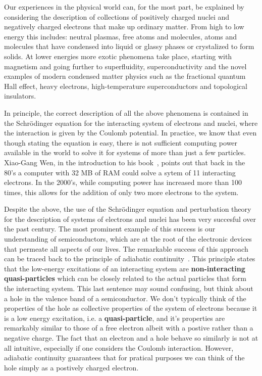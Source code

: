\documentclass[oneside,11pt]{memoir}
\begin{document}
Our experiences in the physical world can, for the most part, be explained by
considering the description of collections of positively charged nuclei and
negatively charged electrons that make up ordinary matter.    From high to low
energy this includes: neutral plasmas,  free atoms and molecules, atoms and
molecules that have condensed into liquid or glassy phases or crystalized to
form solids.   At lower energies more exotic phenomena take place, starting
with magnetism and going further to superfluidity, superconductivity and the
novel examples of modern condensed matter physics such as the fractional
quantum Hall effect, heavy electrons, high-temperature superconductors and
topological insulators.

In principle,  the correct description of all the above phenomena is contained
in the Schr\"{o}dinger equation for the interacting system of electrons and
nuclei,  where the interaction is given by the Coulomb potential. In practice,
we know that even though stating the equation is easy, there is not sufficient
computing power available in the world to solve it for systems of more than
just a few particles.  Xiao-Gang Wen, in the introduction to his
book~\cite{wen2004quantum}, points out that back in the 80's a computer with 32
MB of RAM could solve a sytem of 11 interacting electrons.  In the 2000's,
while computing power has increased more than 100 times, this allows for the
addition of only two more electrons to the system.  

Despite the above,  the use of the Schr\"{o}dinger equation and perturbation
theory for the description of  systems of electrons and nuclei has been very
succesful over the past century.  The most prominent example of this success is
our understanding of semiconductors, which are at the root of the electronic
devices that permeate all aspects of our lives.  The remarkable success of this
approach can be traced back to the principle of adiabatic
continuity~\cite{altland2010condensed}. This principle  states that  the
low-energy excitations of an interacting system  are  \textbf{non-interacting
quasi-particles} which can be closely related to the actual particles that form
the interacting system.   This last sentence may sound confusing, but think
about a hole in the valence band of a semiconductor.  We don't typically think
of the properties of the hole as collective properties of the system of
electrons because it is a low energy excitation, i.e. a
\textbf{quasi-particle}, and it's properties are remarkably similar to those of
a free electron albeit with a postive rather than a negative charge.  The fact
that an electron and a hole behave so similarly is not at all intuitive,
especially if one considers the Coulomb interaction. However, adiabatic
continuity guarantees that for pratical purposes we can think of the hole
simply as a postively charged electron.  
\end{document}
